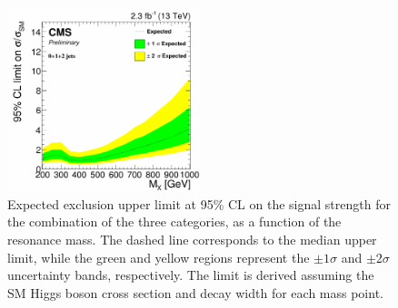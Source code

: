 \begin{figure}[!htb]
\centering
\includegraphics[width=0.5\textwidth]{images/13TeV/HighMass/exp_limit_012jet_mu.pdf}
\caption{Expected exclusion upper limit at 95\% CL on the signal strength for the combination of the three categories, as a function of the resonance mass. The dashed line corresponds to the median upper limit, while the green and yellow regions represent the $\pm 1\sigma$ and $\pm 2 \sigma$ uncertainty bands, respectively. The limit is derived assuming the SM Higgs boson cross section and decay width for each mass point.}\label{fig:13TeVcombexplim}
\end{figure}



